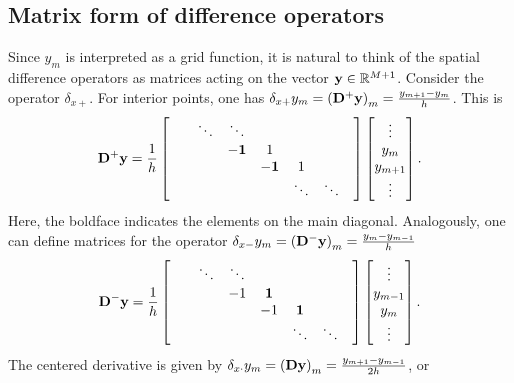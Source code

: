 \documentclass[11pt,twoside,a4paper,english]{book}
\newcommand{\dsp}{\delta_{x+}}
\newcommand{\dsm}{\delta_{x-}}
\newcommand{\dsd}{\delta_{x\cdot}}
\begin{document}
\subsection{Matrix form of difference operators}


Since $y_m$ is interpreted as a grid function, it is natural to think of the spatial difference operators as matrices acting on the vector ${\bf y} \in \mathbb{R}^{M+1}$. Consider the operator $\dsp$. For interior points, one has $\dsp y_m = \left({\bf D}^+ {\bf y}\right)_m = \frac{y_{m+1}-y_m}{h}$. This is
\begin{equation}
{\bf D}^+ {\bf y} = \frac{1}{h}\begin{bmatrix}
& & {\bf \ddots}  & \ddots & & & \\ 
& & & {\bf -1} & 1 & & &\\
& & & & {\bf -1} & 1 & & \\
& & & & & \ddots & \ddots & \\
\end{bmatrix}
\begin{bmatrix}
\vdots \\
y_m \\
y_{m+1}\\
\vdots
\end{bmatrix}.
\end{equation}
Here, the boldface indicates the elements on the main diagonal. Analogously, one can define matrices for the operator $\dsm y_m = \left({\bf D}^- {\bf y}\right)_m = \frac{y_{m}-y_{m-1}}{h}$
\begin{equation}
{\bf D}^- {\bf y} = \frac{1}{h}\begin{bmatrix}
& & \ddots  & \ddots & & & \\ 
& & & -1 & {\bf 1} & & &\\
& & & & -1 & {\bf 1} & & \\
& & & & & \ddots & \ddots & \\
\end{bmatrix}
\begin{bmatrix}
\vdots \\
y_{m-1}\\
y_{m}\\
\vdots
\end{bmatrix}.
\end{equation}
The centered derivative is given by $\dsd y_m = \left({\bf D} {\bf y}\right)_m = \frac{y_{m+1} - y_{m-1}}{2h}$, or
\end{document}
